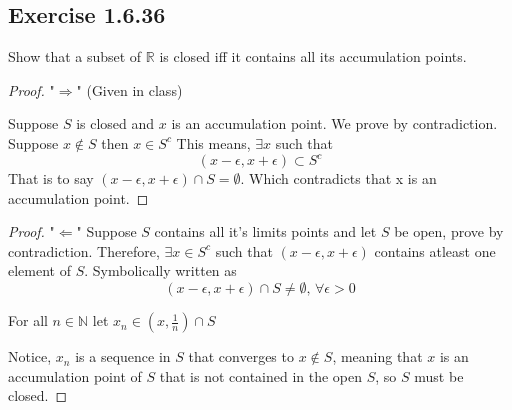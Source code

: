 \documentclass{tufte-book}
\theoremstyle{mytheoremstyle}
\theoremstyle{mylemstyle}
\theoremstyle{mydefstyle}
\begin{document}
\subsection{Exercise 1.6.36}
Show that a subset of $\mathbb{R}$ is closed iff it contains all its accumulation points.

\begin{proof}"$\Rightarrow$" (Given in class)

Suppose $S$ is closed and $x$ is an accumulation point.  We prove by contradiction.  Suppose $x \notin S$ then $x \in S^c$  This means, $\exists x$ such that
\[(x - \epsilon, x+\epsilon) \subset S^c \]
That is to say $(x-\epsilon, x+\epsilon) \cap S = \emptyset$.  Which contradicts that x is an accumulation point.
\end{proof}

\begin{proof}"$\Leftarrow$"
Suppose $S$ contains all it's limits points and let $S$ be open, prove by contradiction.  Therefore, $\exists x \in S^c$ such that $(x- \epsilon, x+\epsilon)$ contains atleast one element of $S$.  Symbolically written as
\[(x- \epsilon, x+\epsilon) \cap S \neq \emptyset \text{,  } \forall \epsilon > 0\]

For all $n \in \mathbb{N}$ let $x_n \in (x, \frac{1}{n}) \cap S$ 

Notice, ${x_n}$ is a sequence in $S$ that converges to $x \notin S$, meaning that $x$ is an accumulation point of $S$ that is not contained in the open $S$, so $S$ must be closed.
\end{proof}
\end{document}

